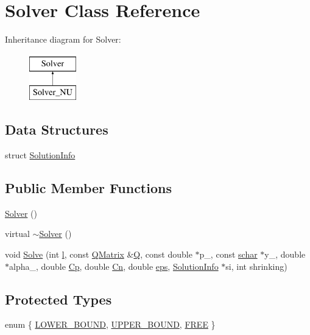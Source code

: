 \hypertarget{classSolver}{}\section{Solver Class Reference}
\label{classSolver}
Inheritance diagram for Solver\+:\begin{figure}[H]
\begin{center}
\leavevmode
\includegraphics[height=2.000000cm]{classSolver}
\end{center}
\end{figure}
\subsection*{Data Structures}
\begin{DoxyCompactItemize}
\item 
struct \hyperlink{structSolver_1_1SolutionInfo}{Solution\+Info}
\end{DoxyCompactItemize}
\subsection*{Public Member Functions}
\begin{DoxyCompactItemize}
\item 
\hyperlink{classSolver_a9dfe7ae9ce617e8a6398be34284c907a}{Solver} ()
\item 
virtual \hyperlink{classSolver_a14f7014dd6e46e3990dea30b5ad3c087}{$\sim$\+Solver} ()
\item 
void \hyperlink{classSolver_aa3ab5672a26826f9dc1ac9145620a823}{Solve} (int \hyperlink{classSolver_a88832d45b6de977b1cbb2afd4c0e494c}{l}, const \hyperlink{classQMatrix}{Q\+Matrix} \&\hyperlink{classSolver_a2d3461718f0570bdc47f5dfb31d61e0a}{Q}, const double $\ast$p\+\_\+, const \hyperlink{svm__core_8cpp_a0fd9ce9d735064461bebfe6037026093}{schar} $\ast$y\+\_\+, double $\ast$alpha\+\_\+, double \hyperlink{classSolver_a2e45dbea8be469bf8247e14768549dd5}{Cp}, double \hyperlink{classSolver_a38d741d194839fb445f982dd78e0b97b}{Cn}, double \hyperlink{classSolver_a718333cc2c1d40abf9c292a788cba1e5}{eps}, \hyperlink{structSolver_1_1SolutionInfo}{Solution\+Info} $\ast$si, int shrinking)
\end{DoxyCompactItemize}
\subsection*{Protected Types}
\begin{DoxyCompactItemize}
\item 
enum \{ \hyperlink{classSolver_a86c1a7637bc803ef8496c7dbf7f00b03aeb78558e05ec0672378c3e801e866560}{L\+O\+W\+E\+R\+\_\+\+B\+O\+U\+ND}, 
\hyperlink{classSolver_a86c1a7637bc803ef8496c7dbf7f00b03aef825a32b2471cdb0724cfa9c1f051fd}{U\+P\+P\+E\+R\+\_\+\+B\+O\+U\+ND}, 
\hyperlink{classSolver_a86c1a7637bc803ef8496c7dbf7f00b03a904f6af2170b6f900fbd3d46cd055c76}{F\+R\+EE}
 \}
\end{DoxyCompactItemize}
